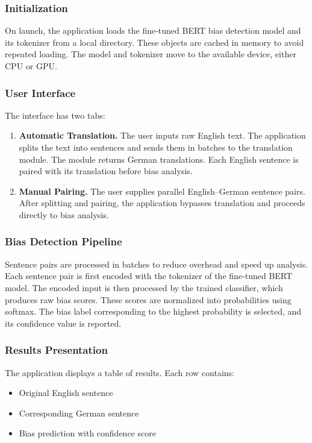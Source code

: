 \subsubsection{Initialization} 
    On launch, the application loads the fine‑tuned BERT bias detection model and its tokenizer from a local directory. These objects are cached in memory to avoid repeated loading. The model and tokenizer move to the available device, either CPU or GPU.

\subsubsection{User Interface} 
The interface has two tabs:
\begin{enumerate}
  \item \textbf{Automatic Translation.} The user inputs raw English text. The application splits the text into sentences and sends them in batches to the translation module. The module returns German translations. Each English sentence is paired with its translation before bias analysis.
  \item \textbf{Manual Pairing.} The user supplies parallel English–German sentence pairs. After splitting and pairing, the application bypasses translation and proceeds directly to bias analysis.
\end{enumerate}

\subsubsection{Bias Detection Pipeline} 
    Sentence pairs are processed in batches to reduce overhead and speed up analysis. Each sentence pair is first encoded with the tokenizer of the fine‑tuned BERT model. The encoded input is then processed by the trained classifier, which produces raw bias scores. These scores are normalized into probabilities using softmax. The bias label corresponding to the highest probability is selected, and its confidence value is reported.

\subsubsection{Results Presentation} 
The application displays a table of results. Each row contains:
\begin{itemize}
  \item Original English sentence
  \item Corresponding German sentence
  \item Bias prediction with confidence score
\end{itemize}
